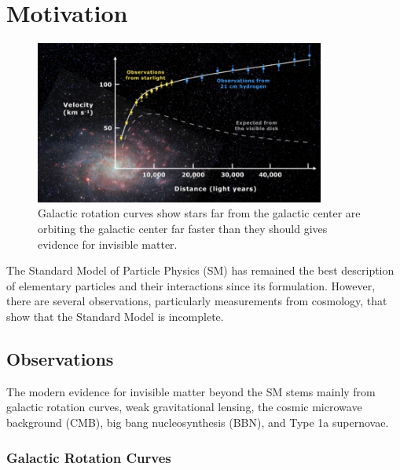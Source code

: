 \chapter{Motivation}\label{chap:motivation}

\begin{figure}
    \centering
    \includegraphics[width=0.85\textwidth]{figs/motivation/dm.png}
    \caption{Galactic rotation curves show stars far from the galactic center are orbiting the galactic center far faster than they should gives evidence for invisible matter.}
    \label{fig:rotationcurve}
\end{figure}

The Standard Model of Particle Physics (SM) has remained the best description of elementary particles and their interactions since its formulation. However, there are several observations, particularly measurements from cosmology, that show that the Standard Model is incomplete. %

\section{Observations}\label{sec:observations}

The modern evidence for invisible matter beyond the SM stems mainly from galactic rotation curves, weak gravitational lensing, the cosmic microwave background (CMB), big bang nucleosynthesis (BBN), and Type 1a supernovae.

\subsection{Galactic Rotation Curves}\label{sec:galactic}

